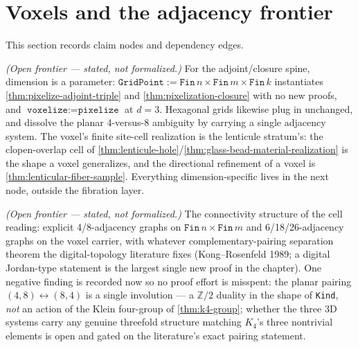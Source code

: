 \section{Voxels and the adjacency frontier}

This section records claim nodes and dependency edges.

\begin{proposition}\label{thm:voxel-instance}\notready{}
\emph{(Open frontier --- stated, not formalized.)} For the adjoint/closure spine,
dimension is a parameter: $\texttt{GridPoint} := \texttt{Fin}\,n \times \texttt{Fin}\,m
\times \texttt{Fin}\,k$ instantiates \cref{thm:pixelize-adjoint-triple} and
\cref{thm:pixelization-closure} with no new proofs, and $\texttt{voxelize} :=
\texttt{pixelize}$ at $d = 3$. Hexagonal grids likewise plug in unchanged, and dissolve
the planar 4-versus-8 ambiguity by carrying a single adjacency system. The voxel's
finite site-cell realization is the lenticule stratum's: the clopen-overlap cell of
\cref{thm:lenticule-hole}/\cref{thm:glass-bead-material-realization} is the shape a
voxel generalizes, and the directional refinement of a voxel is
\cref{thm:lenticular-fiber-sample}. Everything dimension-specific lives in the next
node, outside the fibration layer.
\end{proposition}

\begin{theorem}\label{thm:adjacency-complementarity}\notready{}
\emph{(Open frontier --- stated, not formalized.)} The connectivity structure of the cell
reading: explicit 4/8-adjacency graphs on $\texttt{Fin}\,n \times \texttt{Fin}\,m$ and
6/18/26-adjacency graphs on the voxel carrier, with whatever complementary-pairing
separation theorem the digital-topology literature fixes (Kong--Rosenfeld 1989; a digital
Jordan-type statement is the largest single new proof in the chapter). One negative
finding is recorded now so no proof effort is misspent: the planar pairing
$(4,8) \leftrightarrow (8,4)$ is a single involution --- a $\mathbb{Z}/2$ duality in the
shape of \texttt{Kind}, \emph{not} an action of the Klein four-group of
\cref{thm:k4-group}; whether the three 3D systems carry any genuine threefold structure
matching $K_{4}$'s three nontrivial elements is open and gated on the literature's exact
pairing statement.
\end{theorem}
